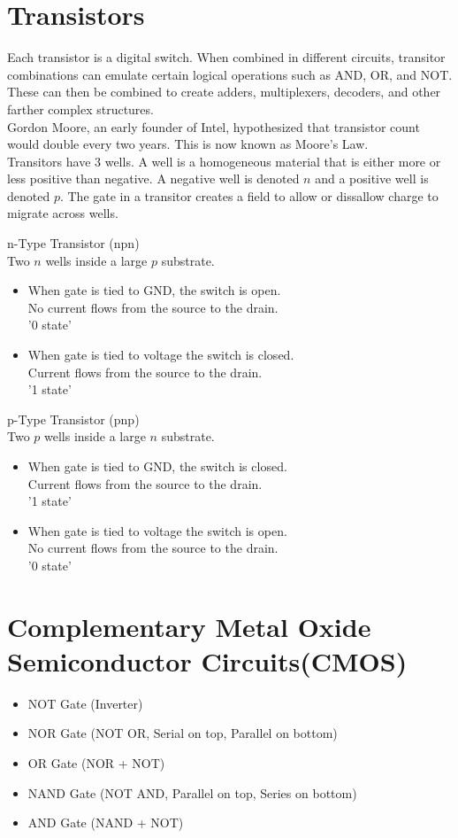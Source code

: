 \documentclass{article}
\begin{document}
\section{Transistors}
Each transistor is a digital switch. When combined in different circuits, transitor combinations can emulate certain logical operations such as AND, OR, and NOT. These can then be combined to create adders, multiplexers, decoders, and other farther complex structures.\\
Gordon Moore, an early founder of Intel, hypothesized that transistor count would double every two years. This is now known as Moore's Law.\\
Transitors have 3 wells. A well is a homogeneous material that is either more or less positive than negative. A negative well is denoted $n$ and a positive well is denoted $p$. The gate in a transitor creates a field to allow or dissallow charge to migrate across wells.

n-Type Transistor (npn)\\
Two $n$ wells inside a large $p$ substrate.
\begin{itemize}
  \item When gate is tied to GND, the switch is open.\\
    No current flows from the source to the drain.\\
    '0 state'
  \item When gate is tied to voltage the switch is closed.\\
    Current flows from the source to the drain.\\
    '1 state'
\end{itemize}

p-Type Transistor (pnp)\\
Two $p$ wells inside a large $n$ substrate.
\begin{itemize}
  \item When gate is tied to GND, the switch is closed.\\
    Current flows from the source to the drain.\\
    '1 state'
  \item When gate is tied to voltage the switch is open.\\
    No current flows from the source to the drain.\\
    '0 state'
\end{itemize}

\section{Complementary Metal Oxide Semiconductor Circuits(CMOS)}
\begin{itemize}
  \item NOT Gate (Inverter)
  \item NOR Gate (NOT OR, Serial on top, Parallel on bottom)
  \item OR Gate (NOR + NOT)
  \item NAND Gate (NOT AND, Parallel on top, Series on bottom)
  \item AND Gate (NAND + NOT)
\end{itemize}
\end{document}
